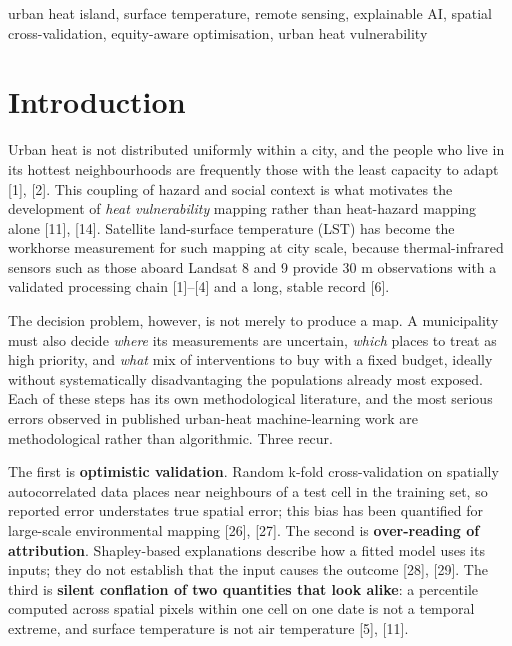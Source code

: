 \documentclass[conference]{IEEEtran}
\begin{document}
\begin{IEEEkeywords}
urban heat island, surface temperature, remote sensing, explainable AI, spatial cross-validation, equity-aware optimisation, urban heat vulnerability
\end{IEEEkeywords}

\section{Introduction}\label{i.-introduction}

Urban heat is not distributed uniformly within a city, and the people who live in its hottest
neighbourhoods are frequently those with the least capacity to adapt {[}1{]}, {[}2{]}. This coupling of
hazard and social context is what motivates the development of \emph{heat vulnerability} mapping rather
than heat-hazard mapping alone {[}11{]}, {[}14{]}. Satellite land-surface temperature (LST) has become the
workhorse measurement for such mapping at city scale, because thermal-infrared sensors such as those
aboard Landsat 8 and 9 provide 30 m observations with a validated processing chain {[}1{]}--{[}4{]} and a
long, stable record {[}6{]}.

The decision problem, however, is not merely to produce a map. A municipality must also decide
\emph{where} its measurements are uncertain, \emph{which} places to treat as high priority, and \emph{what} mix of
interventions to buy with a fixed budget, ideally without systematically disadvantaging the
populations already most exposed. Each of these steps has its own methodological literature, and the
most serious errors observed in published urban-heat machine-learning work are methodological rather
than algorithmic. Three recur.

The first is \textbf{optimistic validation}. Random k-fold cross-validation on spatially autocorrelated
data places near neighbours of a test cell in the training set, so reported error understates true
spatial error; this bias has been quantified for large-scale environmental mapping {[}26{]}, {[}27{]}. The
second is \textbf{over-reading of attribution}. Shapley-based explanations describe how a fitted model
uses its inputs; they do not establish that the input causes the outcome {[}28{]}, {[}29{]}. The third is
\textbf{silent conflation of two quantities that look alike}: a percentile computed across spatial pixels
within one cell on one date is not a temporal extreme, and surface temperature is not air
temperature {[}5{]}, {[}11{]}.
\end{document}
